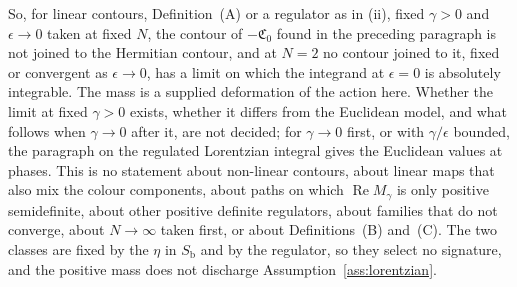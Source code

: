 So, for linear contours, Definition~(A) or a regulator as in (ii), fixed \(\gamma>0\) and \(\epsilon\to0\) taken at fixed \(N\), the contour of \(-\mathfrak C_0\) found in the preceding paragraph is not joined to the Hermitian contour, and at \(N=2\) no contour joined to it, fixed or convergent as \(\epsilon\to0\), has a limit on which the integrand at \(\epsilon=0\) is absolutely integrable. The mass is a supplied deformation of the action here. Whether the limit at fixed \(\gamma>0\) exists, whether it differs from the Euclidean model, and what follows when \(\gamma\to0\) after it, are not decided; for \(\gamma\to0\) first, or with \(\gamma/\epsilon\) bounded, the paragraph on the regulated Lorentzian integral gives the Euclidean values at phases. This is no statement about non-linear contours, about linear maps that also mix the colour components, about paths on which \(\operatorname{Re}M_\gamma\) is only positive semidefinite, about other positive definite regulators, about families that do not converge, about \(N\to\infty\) taken first, or about Definitions~(B) and~(C). The two classes are fixed by the \(\eta\) in \(S_{\mathrm b}\) and by the regulator, so they select no signature, and the positive mass does not discharge Assumption~\ref{ass:lorentzian}.
